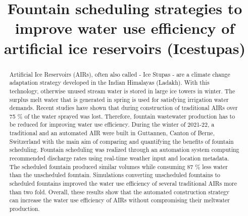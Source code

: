 \documentclass[tc, manuscript]{copernicus}
\begin{document}
\title{Fountain scheduling strategies to improve water use efficiency of artificial
ice reservoirs (Icestupas)}

\def\Authors{Suryanarayanan Balasubramanian\,$^{1,2}$, Martin Hoelzle\,$^{1}$Roger Waser\,$^{3}$, $Martin Von
Burg^{3}\,$}

\def\Address{$^{1}$University of Fribourg, Department of Geosciences, Fribourg, Switzerland $^{2}$University of
Applied Sciences and Arts, Luzern, Switzerland} \def\corrAuthor{Suryanarayanan Balasubramanian}





\maketitle

\begin{abstract}

  Artificial Ice Reservoirs (AIRs), often also called - Ice Stupas - are a climate change adaptation strategy
  developed in the Indian Himalayas (Ladakh). With this technology, otherwise unused stream water is stored in
  large ice towers in winter. The surplus melt water that is generated in spring is used for satisfying
  irrigation water demands. Recent studies have shown that during construction of traditional AIRs over 75 \% of
  the water sprayed was lost. Therefore, fountain wastewater production has to be reduced for improving water
  use efficiency.  During the winter of 2021-22, a traditional and an automated AIR were built in Guttannen,
  Canton of Berne, Switzerland with the main aim of comparing and quantifying the benefits of fountain
  scheduling. Fountain scheduling was realized through an automation system computing recommended discharge
  rates using real-time weather input and location metadata. The scheduled fountain produced similar volumes
  while consuming 87 \% less water than the unscheduled fountain. Simulations converting unscheduled fountains
  to scheduled fountains improved the water use efficiency of several traditional AIRs more than two fold.
  Overall, these results show that the automated construction strategy can increase the water use efficiency of
  AIRs without compromising their meltwater production.

\end{abstract}
\end{document}
